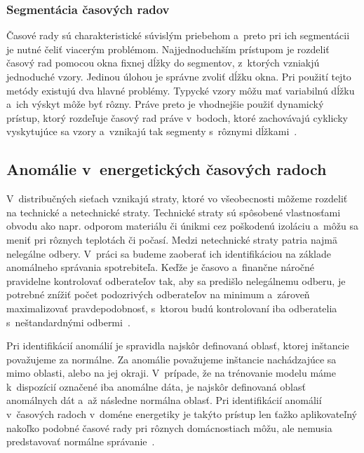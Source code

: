 \documentclass[a4paper,twoside,slovak,12pt,appendix]{article}
\begin{document}
\subsubsection{Segmentácia časových radov}
Časové rady sú charakteristické súvislým priebehom a~preto pri ich segmentácii
je nutné čeliť viacerým problémom. Najjednoduchším prístupom je rozdeliť časový
rad pomocou okna fixnej dĺžky do segmentov, z~ktorých vzniakjú jednoduché vzory.
Jedinou úlohou je správne zvoliť dĺžku okna. Pri použití tejto metódy existujú
dva hlavné problémy. Typycké vzory môžu mať variabilnú dĺžku a~ich výskyt môže
byť rôzny. Práve preto je vhodnejšie použiť dynamický prístup, ktorý rozdeľuje
časový rad práve v~bodoch, ktoré zachovávajú cyklicky vyskytujúce sa vzory
a~vznikajú tak segmenty s~rôznymi dĺžkami~\cite{Fu2011}.





\subsection{Anomálie v~energetických časových radoch}
V~distribučných sieťach vznikajú straty, ktoré vo všeobecnosti môžeme rozdeliť
na technické a netechnické straty. Technické straty sú spôsobené vlastnosťami
obvodu ako napr. odporom materiálu či únikmi cez poškodenú izoláciu a~môžu sa
meniť pri rôznych teplotách či počasí. Medzi netechnické straty patria najmä
nelegálne odbery. V~práci sa budeme zaoberať ich identifikáciou na základe
anomálneho správania spotrebiteľa. Keďže je časovo a~finančne náročné
pravidelne kontrolovať odberateľov tak, aby sa predišlo nelegálnemu odberu,
je potrebné znížiť počet podozrivých odberateľov na minimum a~zároveň
maximalizovať pravdepodobnosť, s~ktorou budú kontrolovaní iba odberatelia
s~neštandardnými odbermi~\cite{Coma-Puig2016,Sahoo2015}.

Pri identifikácií anomálií je spravidla najskôr definovaná oblasť, ktorej
inštancie považujeme za normálne. Za anomálie považujeme inštancie nachádzajúce
sa mimo oblasti, alebo na jej okraji. V~prípade, že na trénovanie modelu máme
k~dispozícií označené iba anomálne dáta, je najskôr definovaná oblasť anomálnych
dát a~až následne normálna oblasť. Pri identifikácií anomálií v~časových radoch
v~doméne energetiky je takýto prístup len ťažko aplikovateľný nakoľko podobné
časové rady pri rôznych domácnostiach môžu, ale nemusia predstavovať normálne
správanie~\cite{Spiric2015}.
\end{document}
